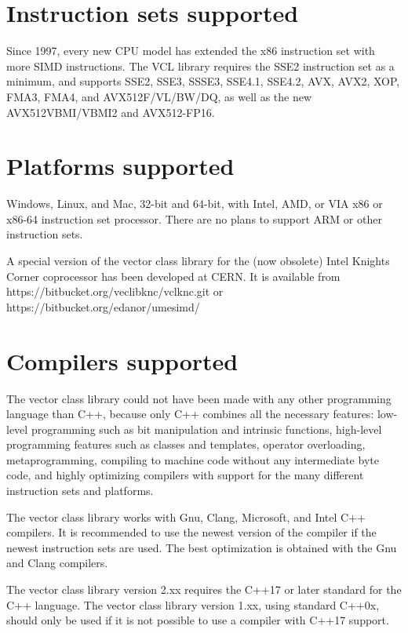 \documentclass[vcl_manual.tex]{subfiles}
\begin{document}
\section{Instruction sets supported} \label{InstructionSetsSupported}
Since 1997, every new CPU model has extended the x86 instruction set with more SIMD instructions. The VCL library requires the SSE2 instruction set as a minimum, and supports SSE2, SSE3, SSSE3, SSE4.1, SSE4.2, AVX, AVX2, XOP, FMA3, FMA4, and AVX512F/VL/BW/DQ, as well as the new AVX512VBMI/VBMI2 and AVX512-FP16.

\section{Platforms supported} \label{PlatformsSupported}
Windows, Linux, and Mac, 32-bit and 64-bit, with Intel, AMD, or VIA x86 or x86-64 instruction set processor. There are no plans to support ARM or other instruction sets.

A special version of the vector class library for the (now obsolete) Intel Knights Corner coprocessor has been developed at CERN. It is available from
https://bitbucket.org/veclibknc/vclknc.git or 
https://bitbucket.org/edanor/umesimd/

\section{Compilers supported} \label{CompilersSupported}
The vector class library could not have been made with any other programming language than C++, because only C++ combines all the necessary features: low-level programming such as bit manipulation and intrinsic functions, high-level programming features such as classes and templates, operator overloading, metaprogramming, compiling to machine code without any intermediate byte code, and highly optimizing compilers with support for the many different instruction sets and platforms.

The vector class library works with Gnu, Clang, Microsoft, and Intel C++ compilers. It is recommended to use the newest version of the compiler if the newest instruction sets are used. The best optimization is obtained with the Gnu and Clang compilers.

The vector class library version 2.xx requires the C++17 or later standard for the C++ language. The vector class library version 1.xx, using standard C++0x, should only be used if it is not possible to use a compiler with C++17 support.
\end{document}
